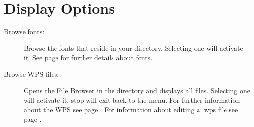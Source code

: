 \section{\label{ref:Displayoptions}Display Options}
  
  \begin{description}
  \item[Browse fonts:]
    Browse the fonts that reside in your  directory. 
    Selecting one will activate it. See page \pageref{ref:Loadingfonts} 
    for further details about fonts.
    
  \item[Browse WPS files:]
    Opens the File Browser in the  directory and displays 
    all  files. Selecting one will activate it, stop will exit 
    back to the menu.  For further information about the WPS see page 
    \pageref{ref:WPS}. For information about editing a .wps file see 
    page \pageref{ref:ConfiguringtheWPS}.
    

\end{description}
